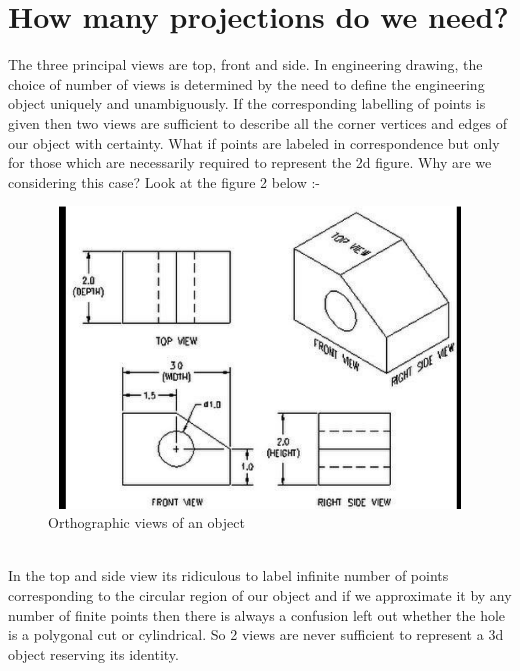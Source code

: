 \documentclass{article}
\begin{document}

\part{How many projections do we need?}
\setcounter{section}{0}
The three principal views are top, front and side. In engineering drawing, the choice of number of views is determined by the need to define the engineering object uniquely and unambiguously. If the corresponding labelling of points is given then two views are sufficient to describe all the corner vertices and edges of our object with certainty. What if points are labeled in correspondence  but only for those which are necessarily required to represent the 2d figure. Why are we considering this case?
Look at the figure 2 below :-

\begin{figure}[H]
  \includegraphics[width=12cm,height=8cm]{fig2.png}
  \caption{Orthographic views of an object}
  \label{fig:boat1}
\end{figure}


\\In the top and side view its ridiculous to label infinite number of points corresponding to the circular region of our object and if we approximate it by any number of finite points then there is always a confusion left out whether the hole is a polygonal cut or cylindrical. So 2 views are never sufficient to represent a 3d object reserving its identity.
\end{document}

